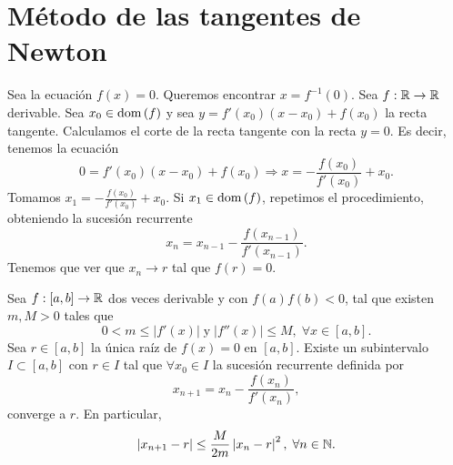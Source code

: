 \section{Método de las tangentes de Newton}
Sea la ecuación $\displaystyle f\left(x\right) = 0 $. Queremos encontrar $\displaystyle x = f^{-1}\left(0\right) $. Sea $\displaystyle f : \mathbb{R} \to \mathbb{R} $ derivable. Sea $\displaystyle x_{0} \in \operatorname{dom}\left(f\right) $ y sea $\displaystyle y = f'\left(x_{0}\right)\left(x-x_{0}\right) + f\left(x_{0}\right) $ la recta tangente. Calculamos el corte de la recta tangente con la recta $\displaystyle y = 0 $. Es decir, tenemos la ecuación 
\[ 0 = f'\left(x_{0}\right)\left(x-x_{0}\right) + f\left(x_{0}\right) \Rightarrow x = -\frac{f\left(x_{0}\right)}{f'\left(x_{0}\right)}+x_{0} .\]
Tomamos $\displaystyle x_{1} = -\frac{f\left(x_{0}\right)}{f'\left(x_{0}\right)}+x_{0} $. Si $\displaystyle x_{1} \in \operatorname{dom}\left(f\right) $, repetimos el procedimiento, obteniendo la sucesión recurrente
\[x_{n} = x_{n-1}-\frac{f\left(x_{n-1}\right)}{f'\left(x_{n-1}\right)} .\]
Tenemos que ver que $\displaystyle x_{n} \to r $ tal que $\displaystyle f\left(r\right) = 0 $.
\begin{ftheorem}
	\normalfont Sea $\displaystyle f : \left[a,b\right] \to \mathbb{R} $ dos veces derivable y con $\displaystyle f\left(a\right)f\left(b\right)<0 $, tal que existen $\displaystyle m,M > 0 $ tales que
	\[ 0 < m \leq \left|f'\left(x\right)\right| \; \text{y} \; \left|f''\left(x\right)\right|\leq M, \; \forall x \in \left[a,b\right]  .\]
	Sea $\displaystyle r \in \left[a,b\right]  $ la única raíz de $\displaystyle f\left(x\right) = 0 $ en $\displaystyle \left[a,b\right]  $. Existe un subintervalo $\displaystyle I \subset \left[a,b\right]  $ con $\displaystyle r \in I $ tal que $\displaystyle \forall x_{0} \in I $ la sucesión recurrente definida por
	\[x_{n+1} = x_{n} - \frac{f\left(x_{n}\right)}{f'\left(x_{n}\right)},\]
	converge a $\displaystyle r $. En particular,
	\[ \left|x_{n+1}-r\right| \leq \frac{M}{2m} \left|x_{n}-r\right|^{2}, \; \forall n \in \mathbb{N} .\]
\end{ftheorem}
